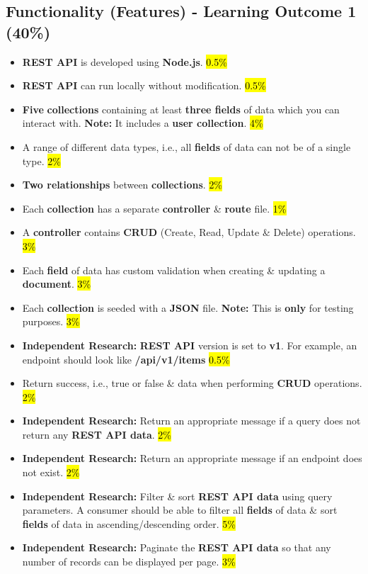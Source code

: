 \documentclass{article}
\begin{document}
\subsection*{Functionality (Features) - Learning Outcome 1 (40\%)}
\begin{itemize}
  \item \textbf{REST API} is developed using \textbf{Node.js}. \hl{0.5\%}
  \item \textbf{REST API} can run locally without modification. \hl{0.5\%}
  \item \textbf{Five} \textbf{collections} containing at least \textbf{three fields} of data which you can interact with. \textbf{Note:} It includes a \textbf{user collection}. \hl{4\%}
  \item A range of different data types, i.e., all \textbf{fields} of data can not be of a single type. \hl{2\%}
  \item \textbf{Two relationships} between \textbf{collections}. \hl{2\%}
  \item Each \textbf{collection} has a separate \textbf{controller} \& \textbf{route} file. \hl{1\%}
  \item A \textbf{controller} contains \textbf{CRUD} (Create, Read, Update \& Delete) operations. \hl{3\%}
  \item Each \textbf{field} of data has custom validation when creating \& updating a \textbf{document}.  \hl{3\%}
  \item Each \textbf{collection} is seeded with a \textbf{JSON} file. \textbf{Note:} This is \textbf{only} for testing purposes. \hl{3\%}
  \item \textbf{Independent Research:} \textbf{REST API} version is set to \textbf{v1}. For example, an endpoint should look like \textbf{/api/v1/items} \hl{0.5\%}
  \item Return success, i.e., true or false \& data when performing \textbf{CRUD} operations. \hl{2\%}
  \item \textbf{Independent Research:} Return an appropriate message if a query does not return any \textbf{REST API data}. \hl{2\%}
  \item \textbf{Independent Research:} Return an appropriate message if an endpoint does not exist. \hl{2\%}
  \item \textbf{Independent Research:} Filter \& sort \textbf{REST API data} using query parameters. A consumer should be able to filter all \textbf{fields} of data \& sort \textbf{fields} of data in ascending/descending order. \hl{5\%}
  \item \textbf{Independent Research:} Paginate the \textbf{REST API data} so that any number of records can be displayed per page. \hl{3\%}

\end{itemize}
\end{document}
